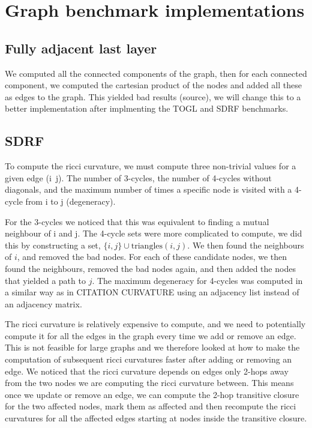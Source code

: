 \documentclass[a4paper,12pt]{article}
\begin{document}
\section{Graph benchmark implementations}
\subsection{Fully adjacent last layer}
We computed all the connected components of the graph, then for each connected component, we computed the cartesian product of the nodes and added all these as edges to the graph.
This yielded bad results (source), we will change this to a better implementation after implmenting the TOGL and SDRF benchmarks.


\subsection{SDRF}
To compute the ricci curvature, we must compute three non-trivial values for a given edge (i~j). The number of 3-cycles, the number of 4-cycles without diagonals, and the maximum number of times a specific node is visited with a 4-cycle from i to j (degeneracy).

For the 3-cycles we noticed that this was equivalent to finding a mutual neighbour of i and j.
The 4-cycle sets were more complicated to compute, we did this by constructing a set, \(\{i, j\} \cup \text{triangles}(i, j)\). We then found the neighbours of \(i\), and removed the bad nodes.
For each of these candidate nodes, we then found the neighbours, removed the bad nodes again, and then added the nodes that yielded a path to \(j\).
The maximum degeneracy for 4-cycles was computed in a similar way as in CITATION CURVATURE using an adjacency list instead of an adjacency matrix.

The ricci curvature is relatively expensive to compute, and we need to potentially compute it for all the edges in the graph every time we add or remove an edge.
This is not feasible for large graphs and we therefore looked at how to make the computation of subsequent ricci curvatures faster after adding or removing an edge.
We noticed that the ricci curvature depends on edges only 2-hops away from the two nodes we are computing the ricci curvature between. 
This means once we update or remove an edge, we can compute the 2-hop transitive closure for the two affected nodes, mark them as affected and then recompute the ricci curvatures for all the affected edges starting at nodes inside the transitive closure.
\end{document}
